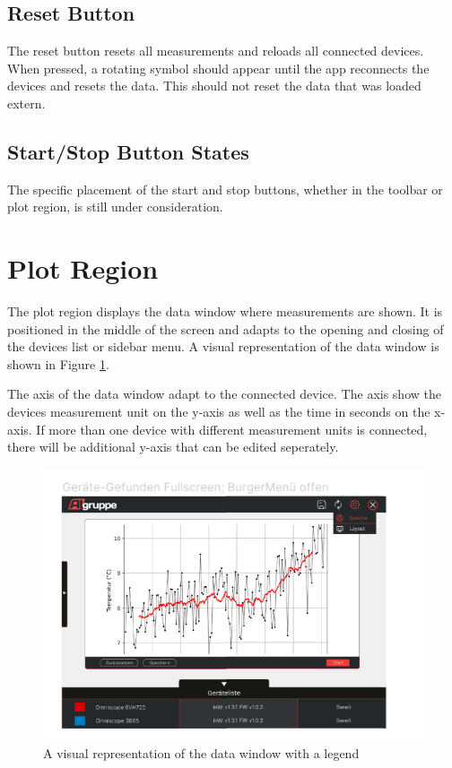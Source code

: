 \documentclass[]{scrreprt}
\begin{document}
\subsection{Reset Button}
The reset button resets all measurements and reloads all connected devices. When pressed, a rotating symbol should appear until the app reconnects the devices and resets the data.
This should not reset the data that was loaded extern. 

\subsection{Start/Stop Button States}
The specific placement of the start and stop buttons, whether in the toolbar or plot region, is still under consideration.

\section{Plot Region}

The plot region displays the data window where measurements are shown.
 It is positioned in the middle of the screen and adapts to the opening and closing of the devices list or sidebar menu. 
 A visual representation of the data window is shown in Figure \ref{fig:datawindow}.

 The axis of the data window adapt to the connected device. The axis show the devices measurement unit on the y-axis as well as the time in seconds on the x-axis. 
 If more than one device with different measurement units is connected, there will be additional y-axis that can be edited seperately.

\begin{figure}
\includegraphics[width=.9\textwidth]{assets/pictures/Mainwindowopen.png}
\caption[]{A visual representation of the data window with a legend}
\label{fig:datawindow}
\end{figure}
\end{document}
